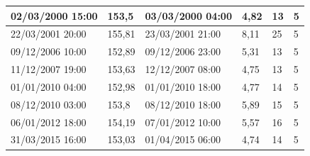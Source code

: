 \documentclass[11pt]{article}
\begin{document}
\begin{longtable}{|l|p{2.3cm}|l|p{2.3cm}|l|l|}
        02/03/2000 15:00 & 153,5 & 03/03/2000 04:00 & 4,82 & 13 & 5 \\ \hline
        22/03/2001 20:00 & 155,81 & 23/03/2001 21:00 & 8,11 & 25 & 5 \\ \hline
        09/12/2006 10:00 & 152,89 & 09/12/2006 23:00 & 5,31 & 13 & 5 \\ \hline
        11/12/2007 19:00 & 153,63 & 12/12/2007 08:00 & 4,75 & 13 & 5 \\ \hline
        01/01/2010 04:00 & 152,98 & 01/01/2010 18:00 & 4,77 & 14 & 5 \\ \hline
        08/12/2010 03:00 & 153,8 & 08/12/2010 18:00 & 5,89 & 15 & 5 \\ \hline
        06/01/2012 18:00 & 154,19 & 07/01/2012 10:00 & 5,57 & 16 & 5 \\ \hline
        31/03/2015 16:00 & 153,03 & 01/04/2015 06:00 & 4,74 & 14 & 5 \\ \hline

\end{longtable}


\FloatBarrier
\newpage
\printbibliography
\end{document}
